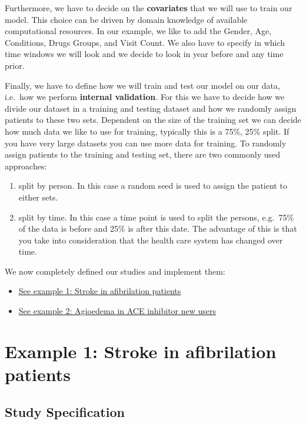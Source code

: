 \documentclass[
]{article}
\providecommand{\tightlist}{%
  \setlength{\itemsep}{0pt}\setlength{\parskip}{0pt}}
\begin{document}
Furthermore, we have to decide on the \textbf{covariates} that we will
use to train our model. This choice can be driven by domain knowledge of
available computational resources. In our example, we like to add the
Gender, Age, Conditions, Drugs Groups, and Visit Count. We also have to
specify in which time windows we will look and we decide to look in year
before and any time prior.

Finally, we have to define how we will train and test our model on our
data, i.e.~how we perform \textbf{internal validation}. For this we have
to decide how we divide our dataset in a training and testing dataset
and how we randomly assign patients to these two sets. Dependent on the
size of the training set we can decide how much data we like to use for
training, typically this is a 75\%, 25\% split. If you have very large
datasets you can use more data for training. To randomly assign patients
to the training and testing set, there are two commonly used approaches:

\begin{enumerate}
\def\labelenumi{\arabic{enumi}.}
\tightlist
\item
  split by person. In this case a random seed is used to assign the
  patient to either sets.
\item
  split by time. In this case a time point is used to split the persons,
  e.g.~75\% of the data is before and 25\% is after this date. The
  advantage of this is that you take into consideration that the health
  care system has changed over time.
\end{enumerate}

We now completely defined our studies and implement them:

\begin{itemize}
\tightlist
\item
  \protect\hyperlink{example1}{See example 1: Stroke in afibrilation
  patients}
\item
  \protect\hyperlink{example2}{See example 2: Agioedema in ACE inhibitor
  new users}
\end{itemize}

\hypertarget{example1}{%
\section{Example 1: Stroke in afibrilation patients}\label{example1}}

\hypertarget{study-specification-1}{%
\subsection{Study Specification}\label{study-specification-1}}
\end{document}
